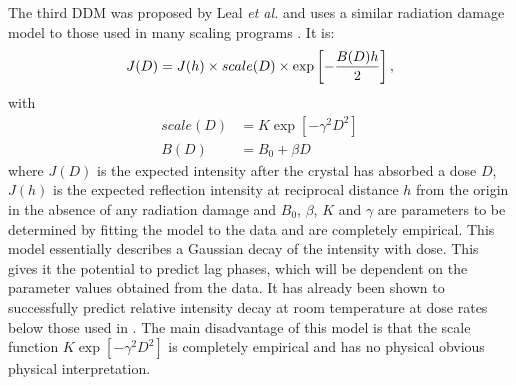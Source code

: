The third DDM was proposed by Leal \emph{et al.} \cite{leal2012} and uses a similar radiation damage model to those used in many scaling programs \cite{evans2013,kabsch2010}. It is:
\begin{equation}
J(D) = J(h) \times scale(D) \times \exp\left[-\frac{B(D) h}{2}\right],
\label{eq:Leal DDM}
\end{equation}
with
\begin{align}
scale(D) &= K\exp\left[-\gamma^2 D^2 \right] \label{eqscale}\\
B(D)     &= B_0 + \beta D \label{eqB}
\end{align}
where $J(D)$ is the expected intensity after the crystal has absorbed a dose $D$, $J(h)$ is the expected reflection intensity at reciprocal distance $h$ from the origin in the absence of any radiation damage and $B_0$, $\beta$, $K$ and $\gamma$ are parameters to be determined by fitting the model to the data and are completely empirical.
\newline
This model essentially describes a Gaussian decay of the intensity with dose.
This gives it the potential to predict lag phases, which will be dependent on the parameter values obtained from the data.
It has already been shown to successfully predict relative intensity decay at room temperature \cite{leal2012} at dose rates below those used in \cite{owen2014}.
The main disadvantage of this model is that the scale function $K \exp\left[-\gamma^2 D^2 \right]$ is completely empirical and has no physical obvious physical interpretation.


